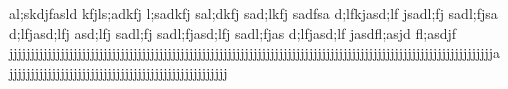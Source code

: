 al;skdjfasld kfjls;adkfj l;sadkfj sal;dkfj sad;lkfj sadfsa d;lfkjasd;lf jsadl;fj sadl;fjsa d;lfjasd;lfj asd;lfj sadl;fj sadl;fjasd;lfj sadl;fjas d;lfjasd;lf jasdfl;asjd fl;asdjf   jjjjjjjjjjjjjjjjjjjjjjjjjjjjjjjjjjjjjjjjjjjjjjjjjjjjjjjjjjjjjjjjjjjjjjjjjjjjjjjjjjjjjjjjjjjjjjjjjjjjjjjjjjjjjjjjja         jjjjjjjjjjjjjjjjjjjjjjjjjjjjjjjjjjjjjjjjjjjjjjjjjjj                                                                                                                                               
